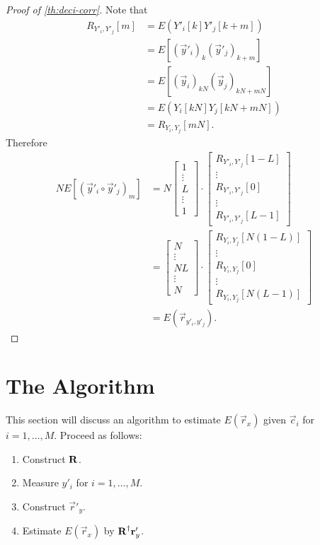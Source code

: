 \documentclass[a4paper, openany, oneside]{memoir}
\begin{document}
\begin{proof}[Proof of \cref{th:deci-corr}]
    Note that
    \begin{align*}
        R_{Y'_i,Y'_j}[m]
        &= E(Y'_i[k]Y'_j[k+m]) \\
        &= E[(\vec{y}'_i)_{k}(\vec{y}'_j)_{k+m}] \\
        &= E[(\vec{y}_i)_{kN}(\vec{y}_j)_{kN+mN}] \\
        &= E(Y_i[kN]Y_j[kN+mN]) \\
        &= R_{Y_i,Y_j}[mN].
    \end{align*}
    Therefore
    \begin{align*}
        N E[(\vec{y}'_i \circ \vec{y}'_j)_m]
        &= N\begin{bmatrix}
            1 \\
            \vdots \\
            L \\
            \vdots \\
            1
        \end{bmatrix} \cdot \begin{bmatrix}
            R_{Y'_i,Y'_j}[1-L] \\
            \vdots \\
            R_{Y'_i,Y'_j}[0] \\
            \vdots \\
            R_{Y'_i,Y'_j}[L-1]
        \end{bmatrix} \\
        &= \begin{bmatrix}
            N \\
            \vdots \\
            NL \\
            \vdots \\
            N
        \end{bmatrix} \cdot \begin{bmatrix}
            R_{Y_i,Y_j}[N(1-L)] \\
            \vdots \\
            R_{Y_i,Y_j}[0] \\
            \vdots \\
            R_{Y_i,Y_j}[N(L-1)]
        \end{bmatrix} \\
        &= E(\vec{r}_{y'_i,y'_j}).
    \end{align*}
\end{proof}
\section{The Algorithm}
This section will discuss an algorithm to estimate $E(\vec{r}_x)$ given $\vec{c}_i$ for $i = 1,\ldots,M$. Proceed as follows:
\begin{enumerate}
    \item Construct $\boldsymbol{\mathbf{R}}$.
    \item Measure $y'_i$ for $i = 1,\ldots,M$.
    \item Construct $\vec{r}'_y$.
    \item Estimate $E(\vec{r}_x)$ by $\boldsymbol{\mathbf{R}}^\dagger\boldsymbol{\mathbf{r}}'_y$.
\end{enumerate}
\end{document}
